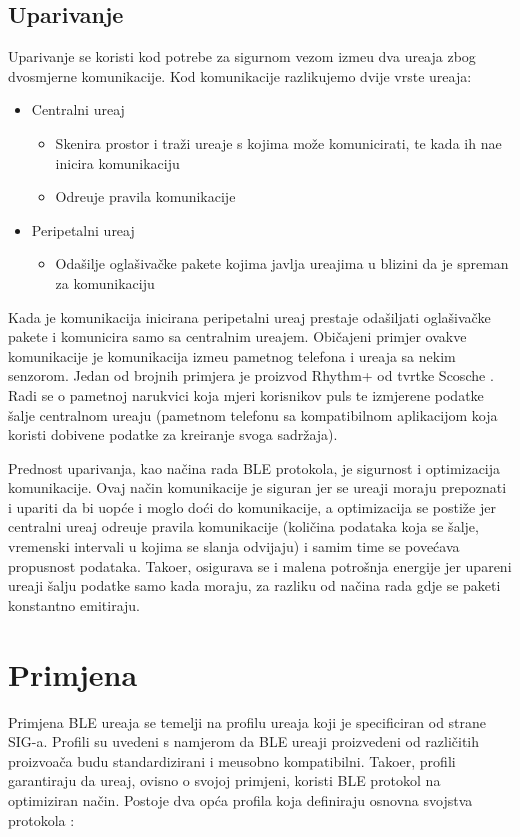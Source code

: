 \subsection{Uparivanje}
Uparivanje se koristi kod potrebe za sigurnom vezom izme\dj u dva ure\dj aja zbog dvosmjerne komunikacije. Kod komunikacije razlikujemo dvije vrste ure\dj aja:


\begin{itemize}
	\item Centralni ure\dj aj
	\begin{itemize}
		\item Skenira prostor i tra\v{z}i ure\dj aje s kojima mo\v{z}e komunicirati, te kada ih na\dj e inicira komunikaciju
		\item Odre\dj uje pravila komunikacije
	\end{itemize}
	\item Peripetalni ure\dj aj
	\begin{itemize}
		\item Oda\v{s}ilje ogla\v{s}iva\v{c}ke pakete kojima javlja ure\dj ajima u blizini da je spreman za komunikaciju
	\end{itemize}
\end{itemize}

Kada je komunikacija inicirana peripetalni ure\dj aj prestaje oda\v{s}iljati ogla\v{s}iva\v{c}ke pakete i komunicira samo sa centralnim ure\dj ajem. Obi\v{c}ajeni primjer ovakve komunikacije je komunikacija izme\dj u pametnog telefona i ure\dj aja sa nekim senzorom. Jedan od brojnih primjera je proizvod Rhythm+ od tvrtke Scosche \cite{scosche} . Radi se o pametnoj narukvici koja mjeri korisnikov puls te izmjerene podatke \v{s}alje centralnom ure\dj aju (pametnom telefonu sa kompatibilnom aplikacijom koja koristi dobivene podatke za kreiranje svoga sadr\v{z}aja).

Prednost uparivanja, kao na\v{c}ina rada BLE protokola, je sigurnost i optimizacija komunikacije. Ovaj na\v{c}in komunikacije je siguran jer se ure\dj aji moraju prepoznati i upariti da bi uop\'{c}e i moglo do\'{c}i do komunikacije, a optimizacija se posti\v{z}e jer centralni ure\dj aj odre\dj uje pravila komunikacije (koli\v{c}ina podataka koja se \v{s}alje, vremenski intervali u kojima se slanja odvijaju) i samim time se pove\'{c}ava propusnost podataka. Tako\dj er, osigurava se i malena potro\v{s}nja energije jer upareni ure\dj aji \v{s}alju podatke samo kada moraju, za razliku od na\v{c}ina rada gdje se paketi konstantno emitiraju.


\section{Primjena}
Primjena BLE ure\dj aja se temelji na profilu ure\dj aja koji je specificiran od strane SIG-a. Profili su uvedeni s namjerom da BLE ure\dj aji proizvedeni od razli\v{c}itih proizvo\dj a\v{c}a budu standardizirani i me\dj usobno kompatibilni. Tako\dj er, profili garantiraju da ure\dj aj, ovisno o svojoj primjeni, koristi BLE protokol na optimiziran na\v{c}in. Postoje dva op\'{c}a profila koja definiraju osnovna svojstva protokola \cite{ble_getting_started}:

